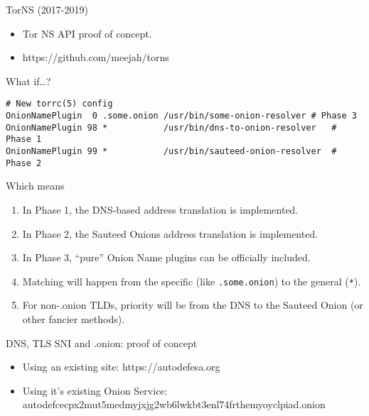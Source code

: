 \documentclass[
  ignorenonframetext,
]{beamer}
\providecommand{\tightlist}{%
  \setlength{\itemsep}{0pt}\setlength{\parskip}{0pt}}
\begin{document}
\begin{frame}{TorNS (2017-2019)}
\protect\hypertarget{torns-2017-2019}{}
\begin{itemize}
\tightlist
\item
  Tor NS API proof of concept.
\item
  https://github.com/meejah/torns
\end{itemize}
\end{frame}

\begin{frame}[fragile]{What if\ldots?}
\protect\hypertarget{what-if}{}
\begin{verbatim}
# New torrc(5) config
OnionNamePlugin  0 .some.onion /usr/bin/some-onion-resolver # Phase 3
OnionNamePlugin 98 *           /usr/bin/dns-to-onion-resolver   # Phase 1
OnionNamePlugin 99 *           /usr/bin/sauteed-onion-resolver  # Phase 2
\end{verbatim}
\end{frame}

\begin{frame}[fragile]{Which means}
\protect\hypertarget{which-means}{}
\begin{enumerate}
\tightlist
\item
  In Phase 1, the DNS-based address translation is implemented.
\item
  In Phase 2, the Sauteed Onions address translation is implemented.
\item
  In Phase 3, ``pure'' Onion Name plugins can be officially included.
\item
  Matching will happen from the specific (like \texttt{.some.onion}) to
  the general (\texttt{*}).
\item
  For non-.onion TLDs, priority will be from the DNS to the Sauteed
  Onion (or other fancier methods).
\end{enumerate}
\end{frame}

\begin{frame}{DNS, TLS SNI and .onion: proof of concept}
\protect\hypertarget{dns-tls-sni-and-.onion-proof-of-concept}{}
\begin{itemize}
\tightlist
\item
  Using an existing site: https://autodefesa.org
\item
  Using it's existing Onion Service:
  autodefcecpx2mut5medmyjxjg2wb6lwkbt3enl74frthemyoyclpiad.onion
\end{itemize}
\end{frame}
\end{document}
